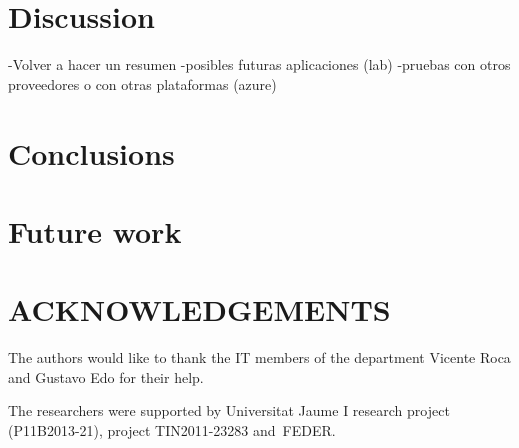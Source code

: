 \documentclass[a4paper,twoside]{article}
\begin{document}
\section{Discussion}
\label{sec:discussion}
-Volver a hacer un resumen
-posibles futuras aplicaciones (lab)
-pruebas con otros proveedores o con otras plataformas (azure)

\section{Conclusions}
\label{sec:conclusions}


\section{Future work}
\label{sec:future}


\section*{\uppercase{Acknowledgements}}
The authors would like to thank the IT members of the department Vicente Roca and Gustavo Edo for their help.

The researchers were supported by Universitat Jaume I research project (P11B2013-21), project
TIN2011-23283 and~FEDER.


{\small
}
\end{document}
